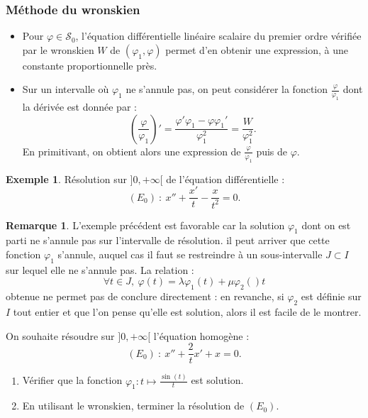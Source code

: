 \documentclass[french]{article}
\theoremstyle{plain}
\theoremstyle{definition}
\newtheorem*{ex}{Exemple}
\newtheorem*{rmq}{Remarque}
\theoremstyle{remark}
\begin{document}
\subsubsection*{Méthode du wronskien}

\begin{itemize}
	\item Pour $\varphi\in\mathcal{S}_0$, l'équation différentielle linéaire scalaire du premier ordre vérifiée par le wronskien $W$ de $(\varphi_1,\varphi)$ permet d'en obtenir une expression, à une constante proportionnelle près.
	\item Sur un intervalle où $\varphi_1$ ne s'annule pas, on peut considérer la fonction $\displaystyle\frac{\varphi}{\varphi_1}$ dont la dérivée est donnée par :
	$$\left(\frac{\varphi}{\varphi_1}\right)'=\frac{\varphi'\varphi_1-\varphi\varphi_1'}{\varphi_1^2}=\frac{W}{\varphi_1^2}.$$
	En primitivant, on obtient alors une expression de $\displaystyle\frac{\varphi}{\varphi_1}$ puis de $\varphi$.
\end{itemize}

\begin{ex}
	Résolution sur $]0,+\infty[$ de l'équation différentielle :
	$$(E_0)\ :\ x''+\frac{x'}{t}-\frac{x}{t^2}=0.$$
\end{ex}

\begin{rmq}
	L'exemple précédent est favorable car la solution $\varphi_1$ dont on est parti ne s'annule pas sur l'intervalle de résolution. il peut arriver que cette fonction $\varphi_1$ s'annule, auquel cas il faut se restreindre à un sous-intervalle $J\subset I$ sur lequel elle ne s'annule pas. La relation :
	$$\forall t\in J,\ \varphi(t)=\lambda\varphi_1(t)+\mu\varphi_2()t$$
	obtenue ne permet pas de conclure directement : en revanche, si $\varphi_2$ est définie sur $I$ tout entier et que l'on pense qu'elle est solution, alors il est facile de le montrer.
\end{rmq}

\begin{exo}
	On souhaite résoudre sur $]0,+\infty[$ l'équation homogène :
	$$(E_0)\ :\ x''+\frac{2}{t}x'+x=0.$$
	\begin{enumerate}
		\item Vérifier que la fonction $\varphi_1:t\mapsto\displaystyle\frac{\sin(t)}{t}$ est solution.
		\item En utilisant le wronskien, terminer la résolution de $(E_0)$.
	\end{enumerate}	
\end{exo}
\end{document}
